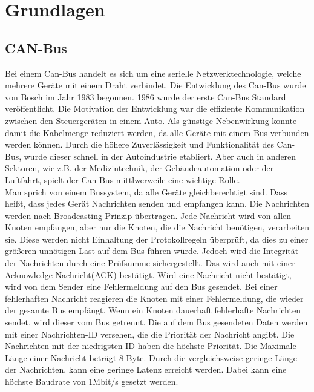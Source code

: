 \chapter{Grundlagen}


\section{CAN-Bus}
Bei einem Can-Bus handelt es sich um eine serielle Netzwerktechnologie, 
welche mehrere Geräte mit einem Draht verbindet.
Die Entwicklung des Can-Bus wurde von Bosch im Jahr 1983 begonnen. 1986 wurde der erste Can-Bus Standard 
veröffentlicht.
Die Motivation der Entwicklung war die effiziente Kommunikation zwischen den Steuergeräten in einem Auto. 
Als günstige
Nebenwirkung konnte damit die Kabelmenge reduziert werden, da alle Geräte mit einem Bus verbunden werden können.
Durch die höhere Zuverlässigkeit und Funktionalität des Can-Bus, wurde dieser schnell in der Autoindustrie etabliert.
Aber auch in anderen Sektoren, wie z.B. der Medizintechnik, der Gebäudeautomation oder der Luftfahrt, spielt der
Can-Bus mittlwerweile eine wichtige Rolle.
\cite[Seiten 2-10]{Voss2008}
\\
Man sprich von einem Bussystem, da alle Geräte gleichberechtigt sind. Dass heißt, dass jedes Gerät Nachrichten 
senden und empfangen kann.
Die Nachrichten werden nach Broadcasting-Prinzip übertragen. Jede Nachricht wird von allen Knoten empfangen, 
aber nur die Knoten, die die Nachricht benötigen, verarbeiten sie. Diese werden nicht Einhaltung der Protokollregeln 
überprüft,
da dies zu einer größeren unnötigen Last auf dem Bus führen würde. 
Jedoch wird die Integrität der Nachrichten durch eine Prüfsumme sichergestellt. Das wird auch mit 
einer Acknowledge-Nachricht(ACK) bestätigt. Wird eine Nachricht nicht bestätigt, wird von dem Sender eine Fehlermeldung
auf den Bus gesendet.
Bei einer fehlerhaften Nachricht reagieren
die Knoten mit einer Fehlermeldung, die wieder der gesamte Bus empfängt. Wenn ein Knoten dauerhaft fehlerhafte
Nachrichten sendet, wird dieser vom Bus getrennt. Die auf dem Bus gesendeten Daten werden mit einer Nachrichten-ID
versehen, die die Priorität der Nachricht angibt. Die Nachrichten mit der niedrigsten ID haben die höchste Priorität.
Die Maximale Länge einer Nachricht beträgt 8 Byte. Durch die vergleichsweise geringe Länge der Nachrichten, kann 
eine geringe Latenz erreicht werden. Dabei kann eine höchste Baudrate von 1Mbit/s gesetzt werden.
\cite[Seiten 13-19]{Voss2008}
\\
